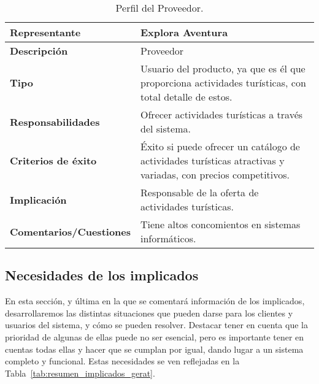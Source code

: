 \begin{table}
    \centering
    \begin{tabular}{|p{5cm}|p{10cm}|}
        \hline
        \cellcolor[HTML]{FFCCC9}\textbf{Representante} & Explora Aventura \\ \hline
        \cellcolor[HTML]{FFCCC9}\textbf{Descripción} & Proveedor \\ \hline
        \cellcolor[HTML]{FFCCC9}\textbf{Tipo} & Usuario del producto, ya que es él que proporciona actividades turísticas, con total detalle de estos. \\ \hline
        \cellcolor[HTML]{FFCCC9}\textbf{Responsabilidades} & Ofrecer actividades turísticas a través del sistema. \\ \hline
        \cellcolor[HTML]{FFCCC9}\textbf{Criterios de éxito} & Éxito si puede ofrecer un catálogo de actividades turísticas atractivas y variadas, con precios competitivos. \\ \hline
        \cellcolor[HTML]{FFCCC9}\textbf{Implicación} & Responsable de la oferta de actividades turísticas. \\ \hline
        \cellcolor[HTML]{FFCCC9}\textbf{Comentarios/Cuestiones} & Tiene altos concomientos en sistemas informáticos. \\ \hline
    \end{tabular}
    \caption{Perfil del Proveedor.}
    \label{tab:per-proveedor}
\end{table}

\subsection{Necesidades de los implicados}
En esta sección, y última en la que se comentará información de los implicados, desarrollaremos las distintas situaciones que pueden darse para los clientes y usuarios del sistema, y cómo se pueden resolver. Destacar tener en cuenta que 
la prioridad de algunas de ellas puede no ser esencial, pero es importante tener en cuentas todas ellas y hacer que se cumplan por igual, dando lugar a un sistema completo y funcional. Estas necesidades se ven reflejadas en la Tabla~\ref{tab:resumen_implicados_gerat}.

